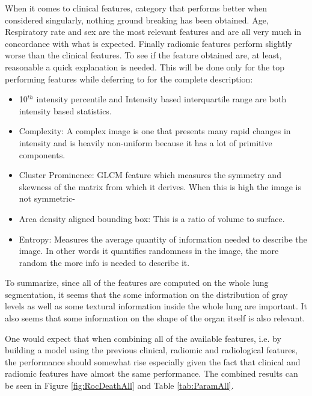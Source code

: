 When it comes to clinical features, category that performs better when considered singularly, nothing ground breaking has been obtained.
Age, Respiratory rate and sex are the most relevant features and are all very much in concordance with what is expected. Finally radiomic features perform slightly worse than the clinical features. To see if the feature obtained are, at least, reasonable a quick explanation is needed. 
This will be done only for the top performing features while deferring to \cite{IBSI} for the complete description:

\begin{itemize}
\item 10$^{th}$ intensity percentile and Intensity based interquartile range are both intensity based statistics.
\item Complexity: A complex image is one that presents many rapid changes in intensity and is heavily non-uniform because it has a lot of primitive components.
\item Cluster Prominence: GLCM feature which measures the symmetry and skewness of the matrix from which it derives. When this is high the image is not symmetric-
\item Area density aligned bounding box: This is a ratio of volume to surface.
\item Entropy: Measures the average quantity of information needed to describe the image. In other words it quantifies randomness in the image, the more random the more info is needed to describe it.
\end{itemize}

To summarize, since all of the features are computed on the whole lung segmentation, it seems that the some information on the distribution of gray levels as well as some textural information inside the whole lung are important.
It also seems that some information on the shape of the organ itself is also relevant.

One would expect that when combining all of the available features, i.e. by building a model using the previous clinical, radiomic and radiological features, the performance should somewhat rise especially given the fact that clinical and radiomic features have almost the same performance. The combined results can be seen in Figure \ref{fig:RocDeathAll} and Table \ref{tab:ParamAll}.

